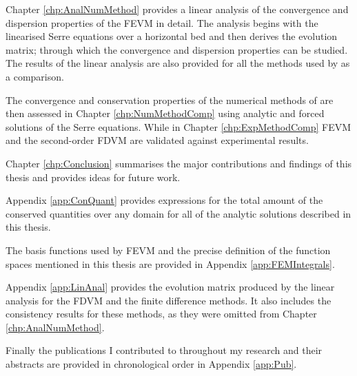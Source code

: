 Chapter \ref{chp:AnalNumMethod} provides a linear analysis of the convergence and dispersion properties of the FEVM in detail. The analysis begins with the linearised Serre equations over a horizontal bed and then derives the evolution matrix; through which the convergence and dispersion properties can be studied. The results of the linear analysis are also provided for all the methods used by \citet{Pitt-2018-61} as a comparison.

The convergence and conservation properties of the numerical methods of \citet{Pitt-2018-61} are then assessed in Chapter \ref{chp:NumMethodComp} using analytic and forced solutions of the Serre equations. While in Chapter \ref{chp:ExpMethodComp} FEVM and the second-order FDVM are validated against experimental results.

Chapter \ref{chp:Conclusion} summarises the major contributions and findings of this thesis and provides ideas for future work.

Appendix \ref{app:ConQuant} provides expressions for the total amount of the conserved quantities over any domain for all of the analytic solutions described in this thesis. 

The basis functions used by FEVM and the precise definition of the function spaces mentioned in this thesis are provided in Appendix \ref{app:FEMIntegrals}. 

Appendix \ref{app:LinAnal} provides the evolution matrix produced by the linear analysis for the FDVM and the finite difference methods. It also includes the consistency results for these methods, as they were omitted from Chapter \ref{chp:AnalNumMethod}.

Finally the publications I contributed to throughout my research and their abstracts are provided in chronological order in Appendix \ref{app:Pub}. 